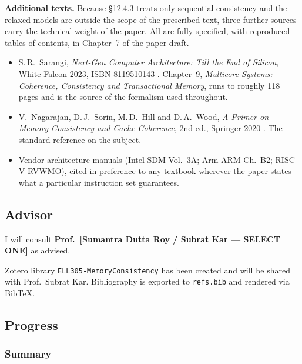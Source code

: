 \noindent\textbf{Additional texts.} Because \S12.4.3 treats only sequential
consistency and the relaxed models are outside the scope of the prescribed
text, three further sources carry the technical weight of the paper.
All are fully specified, with reproduced tables of contents, in
Chapter~7 of the paper draft.

\begin{itemize}[leftmargin=*,itemsep=2pt]
\item S.\,R.~Sarangi, \emph{Next-Gen Computer Architecture: Till the End of
  Silicon}, White Falcon 2023, ISBN 8119510143 \cite{sarangi2023nextgen}.
  Chapter~9, \emph{Multicore Systems: Coherence, Consistency and Transactional
  Memory}, runs to roughly 118 pages and is the source of the formalism used
  throughout.
\item V.~Nagarajan, D.\,J.~Sorin, M.\,D.~Hill and D.\,A.~Wood, \emph{A Primer
  on Memory Consistency and Cache Coherence}, 2nd ed., Springer 2020
  \cite{nagarajan2020primer}. The standard reference on the subject.
\item Vendor architecture manuals (Intel SDM Vol.~3A; Arm ARM Ch.~B2;
  RISC-V RVWMO), cited in preference to any textbook wherever the paper states
  what a particular instruction set guarantees.
\end{itemize}

\subsection{Advisor}

I will consult \textbf{Prof.~[Sumantra Dutta Roy / Subrat Kar --- SELECT ONE]}
as advised.

\medskip
\noindent Zotero library \texttt{ELL305-MemoryConsistency} has been created and
will be shared with Prof.~Subrat Kar. Bibliography is exported to
\texttt{refs.bib} and rendered via BibTeX.

\subsection{Progress}

\subsubsection*{Summary}

